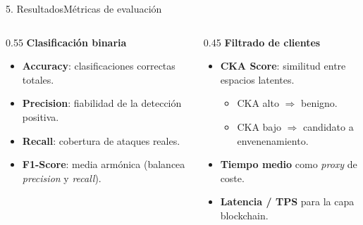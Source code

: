\begin{frame}{5. Resultados}{Métricas de evaluación}
  \begin{columns}[T]
    \begin{column}{0.55\textwidth}
      \textbf{Clasificación binaria}\\[0.3em]
      \begin{itemize}\small
        \item \textbf{Accuracy}: clasificaciones correctas totales.
        \item \textbf{Precision}: fiabilidad de la detección positiva.
        \item \textbf{Recall}: cobertura de ataques reales.
        \item \textbf{F1-Score}: media armónica (balancea \textit{precision} y \textit{recall}).
      \end{itemize}
    \end{column}
    \begin{column}{0.45\textwidth}
      \textbf{Filtrado de clientes}\\[0.3em]
      \begin{itemize}\small
        \item \textbf{CKA Score}: similitud entre espacios latentes.
        \begin{itemize}\scriptsize
          \item CKA alto $\Rightarrow$ benigno.
          \item CKA bajo $\Rightarrow$ candidato a envenenamiento.
        \end{itemize}
        \item \textbf{Tiempo medio} como \textit{proxy} de coste.
        \item \textbf{Latencia / TPS} para la capa blockchain.
      \end{itemize}
    \end{column}
  \end{columns}
\end{frame}

